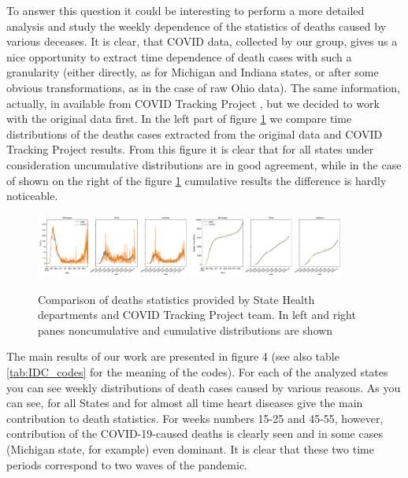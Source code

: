 \documentclass[conference]{IEEEtran}
\begin{document}
To answer this question it could be interesting to perform a more detailed analysis and study the weekly dependence of the statistics of deaths caused by various deceases. It is clear, that COVID data, collected by our group, gives us a nice opportunity to extract time dependence of death cases with such a granularity (either directly, as for Michigan and Indiana states, or after some obvious transformations, as in the case of raw Ohio data). The same information, actually, in available from COVID Tracking Project \cite{covid19tracking_covid_nodate}, but we decided to work with the original data first. In the left part of figure \ref{fig:RT_comp} we compare time distributions of the deaths cases extracted from the original data and COVID Tracking Project results. From this figure it is clear that for all states under consideration uncumulative distributions are in good agreement, while in the case of shown on the right of the figure \ref{fig:RT_comp} cumulative results the difference is hardly noticeable.

\begin{figure}
  \centering
  \includegraphics[width=0.45\textwidth]{figs/raw_tracker_comp_nc}
  \includegraphics[width=0.45\textwidth]{figs/raw_tracker_comp_cum}
  \caption{Comparison of deaths statistics provided by State Health departments and COVID Tracking Project team. In left and right panes noncumulative and cumulative distributions are shown}
  \label{fig:RT_comp}
\end{figure}


The main results of our work are presented in figure 4 (see also table \ref{tab:IDC_codes} for the meaning of the codes). For each of the analyzed states you can see weekly distributions of death cases caused by various reasons. As you can see, for all States and for almost all time heart diseases give the main contribution to death statistics. For weeks numbers 15-25 and 45-55, however, contribution of the COVID-19-caused deaths is clearly seen and in some cases (Michigan state, for example) even dominant. It is clear that these two time periods correspond to two waves of the pandemic.
\end{document}
